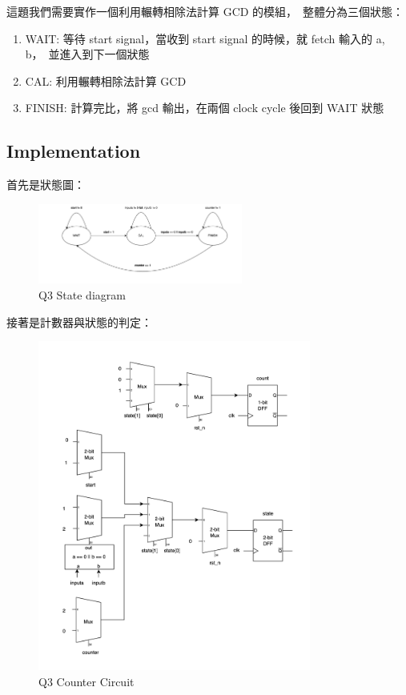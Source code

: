 \documentclass[10.5pt,compsoc,UTF8]{CjC}
\theoremstyle{mystyle}
\begin{document}
這題我們需要實作一個利用輾轉相除法計算 GCD 的模組，\
整體分為三個狀態：
\begin{enumerate}
  \item WAIT: 等待 start signal，當收到 start signal 的時候，就 fetch 輸入的 a, b，\
        並進入到下一個狀態
  \item CAL: 利用輾轉相除法計算 GCD
  \item FINISH: 計算完比，將 gcd 輸出，在兩個 clock cycle 後回到 WAIT 狀態
\end{enumerate}

\subsection{Implementation}

首先是狀態圖：\\
\begin{figure}[h!]
    \centering
    \includegraphics[width=0.6\textwidth]{./img/Q3-state.png}
    \caption{Q3 State diagram}
    \label{fig:Q3-state}
\end{figure}

\newpage

接著是計數器與狀態的判定：\\

\begin{figure}[h!]
  \centering
  \includegraphics[width=0.8\textwidth]{./img/Q3-counter.png}
  \caption{Q3 Counter Circuit}
  \label{fig:Q3-counter}
\end{figure}
\end{document}
